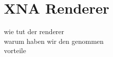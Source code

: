 \section{XNA Renderer}
\begin{Spacing}{\mylinespace}

wie tut der renderer \\
warum haben wir den genommen\\
vorteile\\


\end{Spacing}
\newpage
\clearpage
